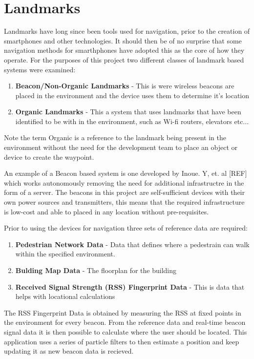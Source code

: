 \documentclass[main.tex]{subfiles}
\begin{document}
\section{Landmarks}

Landmarks have long since been tools used for navigation, prior to the creation of smartphones and other technologies. It should then be of no surprise that some navigation methods for smarthphones have adopted this as the core of how they operate. For the purposes of this project two different classes of landmark based systems were examined:

\begin{enumerate}
	\item \textbf{Beacon/Non-Organic Landmarks} - This is were wireless beacons are placed in the environment and the device uses them to determine it's location
	\item \textbf{Organic Landmarks} - This a system that uses landmarks that have been identified to be with in the environment, such as Wi-fi routers, elevators etc...
\end{enumerate}

Note the term Organic is a reference to the landmark being present in the environment without the need for the development team to place an object or device to create the waypoint.

An example of a Beacon based system is one developed by Inoue. Y, et. al [REF] which works autonomously removing the need for additional infrastructre in the form of a server. The beacons in this project are self-sufficient devices with their own power sources and transmitters, this means that the required infrastructure is low-cost and able to placed in any location without pre-requisites.

Prior to using the devices for navigation three sets of reference data are required:

\begin{enumerate}
	\item \textbf{Pedestrian Network Data} - Data that defines where a pedestrain can walk within the specified environment.
	\item \textbf{Bulding Map Data} - The floorplan for the building
	\item \textbf{Received Signal Strength (RSS) Fingerprint Data} - This is data that helps with locational calculations
\end{enumerate}

The RSS Fingerprint Data is obtained by measuring the RSS at fixed points in the environment for every beacon. From the reference data and real-time beacon signal data it is then possible to calculate where the user should be located. This application uses a series of particle filters to then estimate a position and keep updating it as new beacon data is recieved.
\end{document}

